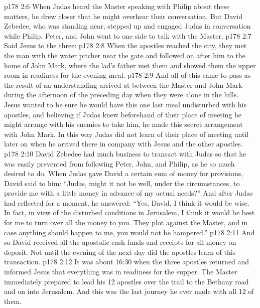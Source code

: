 \vs p178 2:6 When Judas heard the Master speaking with Philip about these matters, he drew closer that he might overhear their conversation. But David Zebedee, who was standing near, stepped up and engaged Judas in conversation while Philip, Peter, and John went to one side to talk with the Master.
\vs p178 2:7 Said Jesus to the three: 
\vs p178 2:8 When the apostles reached the city, they met the man with the water pitcher near the gate and followed on after him to the home of John Mark, where the lad’s father met them and showed them the upper room in readiness for the evening meal.
\vs p178 2:9 And all of this came to pass as the result of an understanding arrived at between the Master and John Mark during the afternoon of the preceding day when they were alone in the hills. Jesus wanted to be sure he would have this one last meal undisturbed with his apostles, and believing if Judas knew beforehand of their place of meeting he might arrange with his enemies to take him, he made this secret arrangement with John Mark. In this way Judas did not learn of their place of meeting until later on when he arrived there in company with Jesus and the other apostles.
\vs p178 2:10 \pc David Zebedee had much business to transact with Judas so that he was easily prevented from following Peter, John, and Philip, as he so much desired to do. When Judas gave David a certain sum of money for provisions, David said to him: “Judas, might it not be well, under the circumstances, to provide me with a little money in advance of my actual needs?” And after Judas had reflected for a moment, he answered: “Yes, David, I think it would be wise. In fact, in view of the disturbed conditions in Jerusalem, I think it would be best for me to turn over all the money to you. They plot against the Master, and in case anything should happen to me, you would not be hampered.”
\vs p178 2:11 And so David received all the apostolic cash funds and receipts for all money on deposit. Not until the evening of the next day did the apostles learn of this transaction.
\vs p178 2:12 \pc It was about 16:30 when the three apostles returned and informed Jesus that everything was in readiness for the supper. The Master immediately prepared to lead his 12 apostles over the trail to the Bethany road and on into Jerusalem. And this was the last journey he ever made with all 12 of them.

